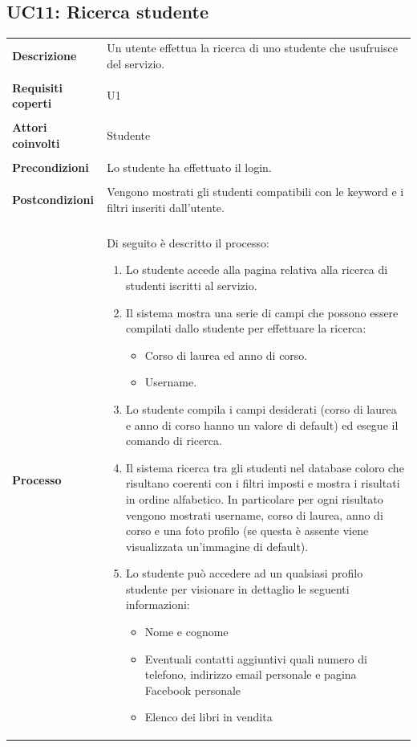 \documentclass[10pt,a4paper]{article}
\begin{document}
	\subsection{UC11: Ricerca studente}
	\begin{tabular}{lp{}}
		\textbf{Descrizione}&Un utente effettua la ricerca di uno studente che usufruisce del servizio.\\
		\\
		\textbf{Requisiti coperti}&U1\\
		\\
		\textbf{Attori coinvolti}&Studente\\
		\\
		\textbf{Precondizioni}&Lo studente ha effettuato il login.\\
		\\
		\textbf{Postcondizioni}&Vengono mostrati gli studenti compatibili con le keyword e i filtri inseriti dall'utente.\\
		\\
		\textbf{Processo}&Di seguito è descritto il processo:
		\begin{enumerate}
			\item Lo studente accede alla pagina relativa alla ricerca di studenti iscritti al servizio.
			\item Il sistema mostra una serie di campi che possono essere compilati dallo studente per effettuare la ricerca:
			\begin{itemize}
				\item Corso di laurea ed anno di corso.
				\item Username.		
			\end{itemize}
			\item Lo studente compila i campi desiderati (corso di laurea e anno di corso hanno un valore di default) ed esegue il comando di ricerca.
			\item Il sistema ricerca tra gli studenti nel database coloro che risultano coerenti con i filtri imposti e mostra i risultati in ordine alfabetico. In particolare per ogni risultato vengono mostrati username, corso di laurea, anno di corso e una foto profilo (se questa è assente viene visualizzata un'immagine di default).
			\item Lo studente può accedere ad un qualsiasi profilo studente per visionare in dettaglio le seguenti informazioni:
			\begin{itemize}
				\item Nome e cognome
				\item Eventuali contatti aggiuntivi quali numero di telefono, indirizzo email personale e pagina Facebook personale
				\item Elenco dei libri in vendita
			\end{itemize}
		\end{enumerate}
	\end{tabular}
	
\end{document}
